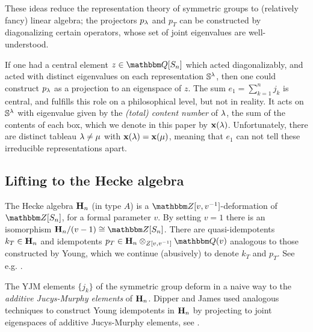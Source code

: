 
These ideas reduce the representation theory of symmetric groups to (relatively fancy) linear algebra; the projectors $p_\lambda$ and $p_T$ can be constructed by diagonalizing certain
operators, whose set of joint eigenvalues are well-understood.

If one had a central element $z \in \Q[S_n]$ which acted diagonalizably, and acted with distinct eigenvalues on each representation ${\mathbb{S}}^\lambda$, then one could construct $p_\lambda$ as a
projection to an eigenspace of $z$. The sum $e_1 = \sum_{k=1}^n j_k$ is central, and fulfills this role on a philosophical level, but not in reality. It acts on ${\mathbb{S}}^\lambda$ with eigenvalue
given by the \emph{(total) content number} of $\lambda$, the sum of the contents of each box, which we denote in this paper by $\mathbf{x}(\lambda)$. Unfortunately, there are distinct tableau $\lambda \ne
\mu$ with $\mathbf{x}(\lambda) = \mathbf{x}(\mu)$, meaning that $e_1$ can not tell these irreducible representations apart.

\subsection{Lifting to the Hecke algebra}


The Hecke algebra ${\mathbf H}_n$ (in type $A$) is a $\Z[v,v\inv]$-deformation of $\Z[S_n]$, for a formal parameter $v$. By setting $v=1$ there is an isomorphism $\Hecke_n / (v-1) \cong
\Z[S_n]$. There are quasi-idempotents $k_T \in {\mathbf H}_n$ and idempotents $p_T \in \Hecke_n \ot_{Z[v,v\inv]} \Q(v)$ analogous to those constructed by Young, which we continue (abusively) to denote $k_T$ and $p_T$. See e.g. \cite[\S 5]{DipperJamesIdemp}.

The YJM elements $\{j_k\}$ of the symmetric group deform in a naive way to the \emph{additive Jucys-Murphy elements} of ${\mathbf H}_n$.  Dipper and James used analogous techniques to construct Young idempotents in ${\mathbf H}_n$ by projecting to joint eigenspaces of additive Jucys-Murphy elements, see \cite[p75]{DipperJamesIdemp}.

